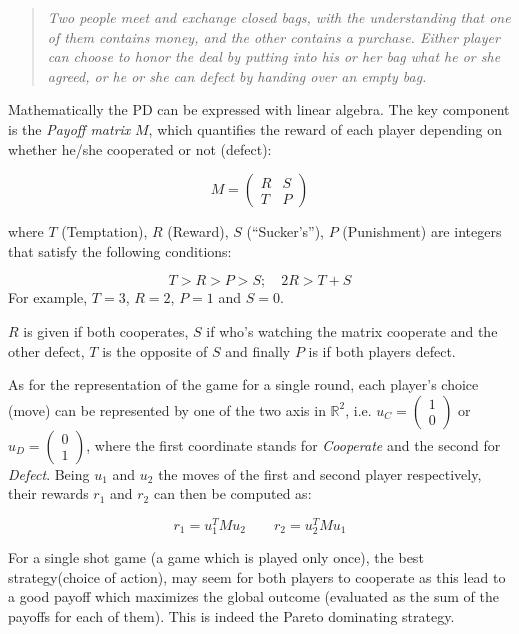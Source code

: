 \documentclass[journal,a4paper,10pt,twoside,draft=false]{IEEEtran}
\begin{document}
\begin{quote}
\textit{Two people meet and exchange closed bags, with the understanding that one of them contains money, and the other contains a purchase. Either player can choose to honor the deal by putting into his or her bag what he or she agreed, or he or she can defect by handing over an empty bag.}
\end{quote}

Mathematically the PD can be expressed with linear algebra. The key component is the \textit{Payoff matrix} $M$, which quantifies the reward of each player depending on whether he/she cooperated or not (defect):

$$
M = 
\begin{pmatrix} 
R & S \\
T & P 
\end{pmatrix}
$$

where $T$ (Temptation), $R$ (Reward), $S$ (``Sucker's''), $P$ (Punishment) are integers that satisfy the following conditions:

$$
T>R>P>S; \quad 2R > T+S 
$$
For example, $T=3$, $R=2$, $P=1$ and $S=0$.

$R$ is given if both cooperates, $S$ if who's watching the matrix cooperate and the other defect, $T$ is the opposite of $S$ and finally $P$ is if both players defect.

As for the representation of the game for a single round, each player's choice (move) can be represented by one of the two axis in $\mathbb{R}^2$, i.e. $u_C=\begin{pmatrix} 1 \\ 0 \end{pmatrix}$ or $u_D=\begin{pmatrix} 0 \\ 1 \end{pmatrix}$, where the first coordinate stands for \textit{Cooperate} and the second for \textit{Defect}. Being $u_1$ and $u_2$ the moves of the first and second player respectively, their rewards $r_1$ and $r_2$ can then be computed as:

$$
r_1 = u_1^T M u_2
\quad
\quad
r_2 = u_2^T M u_1
$$

For a single shot game (a game which is played only once), the best strategy(choice of action), may seem for both players to cooperate as this lead to a good payoff which maximizes the global outcome (evaluated as the sum of the payoffs for each of them). This is indeed the Pareto dominating strategy. 
\end{document}
